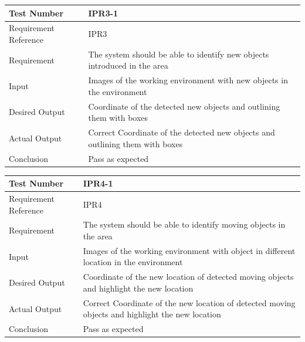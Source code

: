 \documentclass[12pt, titlepage]{article}
\begin{document}
\begin{table}[H]
\begin{center}
\begin{tabular}{|l | m{9cm}|}
\hline
  Test Number & IPR3-1\\
  \hline
  Requirement Reference & IPR3\\
  \hline
  Requirement &  The system should be able to identify new objects introduced in the area\\
  \hline
  Input & Images of the working environment with new objects in the environment\\
  \hline
  Desired Output & Coordinate of the detected new objects and outlining them with boxes\\
  \hline
  Actual Output & Correct Coordinate of the detected new objects and outlining them with boxes\\
  \hline
  Conclusion & Pass as expected\\
  \hline
\end{tabular}
\end{center}           
\end{table}

\begin{table}[H]
\begin{center}
\begin{tabular}{|l | m{9cm}|}
\hline
  Test Number & IPR4-1\\
  \hline
  Requirement Reference & IPR4\\
  \hline
  Requirement &  The system should be able to identify moving objects in the area\\
  \hline
  Input & Images of the working environment with object in different location in the environment\\
  \hline
  Desired Output & Coordinate of the new location of detected moving objects and highlight the new location\\
  \hline
  Actual Output & Correct Coordinate of the new location of detected moving objects and highlight the new location\\
  \hline
  Conclusion & Pass as expected\\
  \hline
\end{tabular}
\end{center}           
\end{table}
\end{document}
